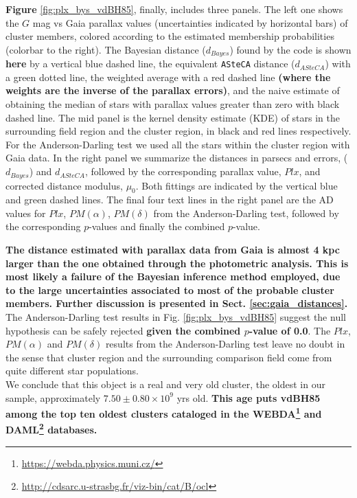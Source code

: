 \documentclass[referee]{aa}
\begin{document}
\textbf{Figure} \ref{fig:plx_bys_vdBH85}, finally, includes three panels. The
left one shows the $G$ mag vs Gaia parallax values (uncertainties indicated by
horizontal bars) of cluster members, colored according to the estimated
membership probabilities (colorbar to the right).
%
The Bayesian distance ($d_{Bayes}$) found by the code is shown \textbf{here} by
a vertical blue dashed line, the equivalent \texttt{ASteCA} distance
($d_{ASteCA}$) with a green dotted line, the weighted average with a red dashed
line \textbf{(where the weights are the inverse of the parallax
errors)}, and the naive estimate of obtaining the median of stars with
parallax values greater than zero with black dashed line.
%
The mid panel is the kernel density estimate (KDE) of stars in the surrounding
field region and the cluster region, in black and red lines respectively. For
the Anderson-Darling test we used all the stars within the cluster region with
Gaia data. In the right panel we summarize the distances in parsecs and errors,
($d_{Bayes}$) and $d_{ASteCA}$, followed by the corresponding parallax
value, $Plx$, and corrected distance modulus, $\mu_0$. Both fittings are
indicated by the vertical blue and green dashed lines. The final
four text lines in the right panel are the AD values for $Plx$, $PM(\alpha)$,
$PM(\delta)$ from the Anderson-Darling test, followed by the corresponding
$p$-values and finally the combined $p$-value.

\textbf{The distance estimated with parallax data from Gaia is almost 4 kpc
larger than the one obtained through the photometric analysis. This is most
likely a failure of the Bayesian inference method employed, due to the large
uncertainties associated to most of the probable cluster members. Further
discussion is presented in Sect. \ref{sec:gaia_distances}.
}
%
The Anderson-Darling test results in Fig. \ref{fig:plx_bys_vdBH85} suggest the
null hypothesis can be safely rejected \textbf{given the combined $p$-value of
0.0}. The $Plx$, $PM(\alpha)$ and $PM(\delta)$ results from the
Anderson-Darling test leave no doubt in the sense that cluster region and the
surrounding comparison field come from quite different star populations.\\

We conclude that this object is a real and very old cluster, the oldest in our
sample, approximately $7.50\pm0.80\times10^9$ yrs old. \textbf{This age puts
vdBH85 among the top ten oldest clusters cataloged in the
WEBDA\footnote{\url{https://webda.physics.muni.cz/}} and
DAML\footnote{\url{http://cdsarc.u-strasbg.fr/viz-bin/cat/B/ocl}}
\citep{Dias_2002} databases.
}
\end{document}
